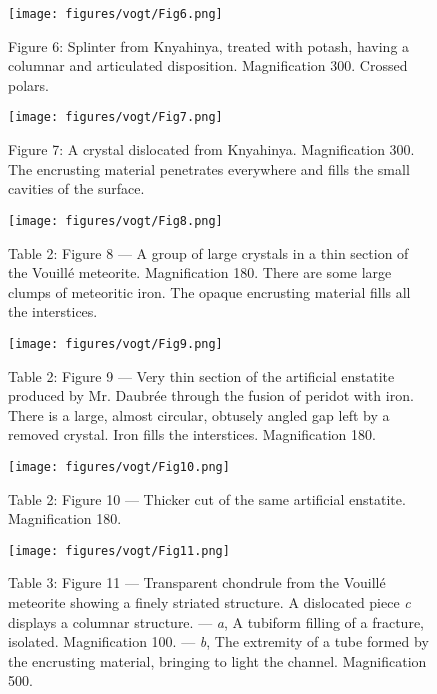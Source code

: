 \documentclass[a4paper, 12pt, oneside]{article}
\begin{document}
\clearpage
\begin{figure}[b]
\centering
\texttt{[image: figures/vogt/Fig6.png]}
\caption{Figure 6: Splinter from Knyahinya, treated with potash, having a columnar and articulated disposition. Magnification 300. Crossed polars.}
\end{figure}
\clearpage
\begin{figure}[b]
\centering
\texttt{[image: figures/vogt/Fig7.png]}
\caption{Figure 7: A crystal dislocated from Knyahinya. Magnification 300. The encrusting material penetrates everywhere and fills the small cavities of the surface.}
\end{figure}
\clearpage
\begin{figure}[b]
\texttt{[image: figures/vogt/Fig8.png]}
\caption{Table 2: Figure 8 --- A group of large crystals in a thin section of the Vouillé meteorite. Magnification 180. There are some large clumps of meteoritic iron. The opaque encrusting material fills all the interstices.}
\centering
\end{figure}
\clearpage
\begin{figure}[b]
\texttt{[image: figures/vogt/Fig9.png]}
\caption{Table 2: Figure 9 --- Very thin section of the artificial enstatite produced by Mr. Daubrée through the fusion of peridot with iron. There is a large, almost circular, obtusely angled gap left by a removed crystal. Iron fills the interstices. Magnification 180.}
\centering
\end{figure}
\clearpage
\begin{figure}[b]
\texttt{[image: figures/vogt/Fig10.png]}
\caption{Table 2: Figure 10 --- Thicker cut of the same artificial enstatite. Magnification 180.}
\centering
\end{figure}
\clearpage
\begin{figure}[b]
\texttt{[image: figures/vogt/Fig11.png]}
\caption{Table 3: Figure 11 --- Transparent chondrule from the Vouillé meteorite showing a finely striated structure. A dislocated piece \emph{c} displays a columnar structure. --- \emph{a}, A tubiform filling of a fracture, isolated. Magnification 100. --- \emph{b}, The extremity of a tube formed by the encrusting material, bringing to light the channel. Magnification 500.}
\centering
\end{figure}
\end{document}
